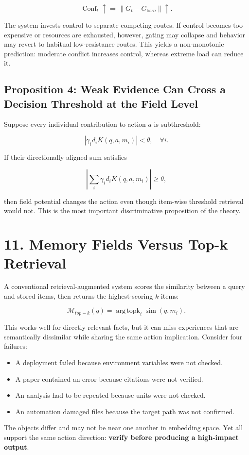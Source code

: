 \documentclass[11pt, a4paper]{article}
\begin{document}
\[
\operatorname{Conf}_t\uparrow\Rightarrow\|G_t-G_{\mathrm{base}}\|\uparrow.
\]

The system invests control to separate competing routes. If control becomes too expensive or resources are exhausted, however, gating may collapse and behavior may revert to habitual low-resistance routes. This yields a non-monotonic prediction: moderate conflict increases control, whereas extreme load can reduce it.

\subsection{Proposition 4: Weak Evidence Can Cross a Decision Threshold at the Field Level}

Suppose every individual contribution to action $a$ is subthreshold:

\[
|\gamma_i d_iK(q,a,m_i)|<\theta,\quad\forall i.
\]

If their directionally aligned sum satisfies

\[
\left|\sum_i\gamma_i d_iK(q,a,m_i)\right|\ge\theta,
\]

then field potential changes the action even though item-wise threshold retrieval would not. This is the most important discriminative proposition of the theory.


\section{11. Memory Fields Versus Top-k Retrieval}

A conventional retrieval-augmented system scores the similarity between a query and stored items, then returns the highest-scoring $k$ items:

\[
\mathcal{M}_{top-k}(q)=\operatorname{arg\,topk}_i\operatorname{sim}(q,m_i).
\]

This works well for directly relevant facts, but it can miss experiences that are semantically dissimilar while sharing the same action implication. Consider four failures:

\begin{itemize}
\item A deployment failed because environment variables were not checked.
\item A paper contained an error because citations were not verified.
\item An analysis had to be repeated because units were not checked.
\item An automation damaged files because the target path was not confirmed.

\end{itemize}
The objects differ and may not be near one another in embedding space. Yet all support the same action direction: \textbf{verify before producing a high-impact output}.
\end{document}
